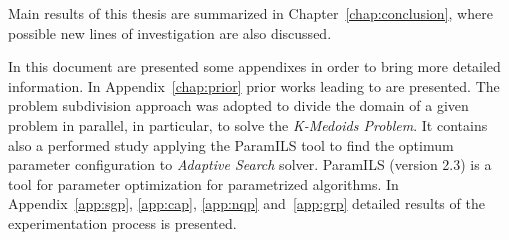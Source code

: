 Main results of this thesis are summarized in Chapter~\ref{chap:conclusion}, where possible new lines of investigation are also discussed.

In this document are presented some appendixes in order to bring more detailed information. In Appendix~\ref{chap:prior} prior works leading to \posl{} are presented. The problem subdivision approach was adopted to divide the domain of a given problem in parallel, in particular, to solve the \textit{K-Medoids Problem}. It contains also a performed study applying the {\sc ParamILS} tool to find the optimum parameter configuration to \textit{Adaptive Search} solver. {\sc ParamILS} (version 2.3) is a tool for parameter optimization for parametrized algorithms. In Appendix~\ref{app:sgp}, \ref{app:cap}, \ref{app:nqp} and~\ref{app:grp} detailed results of the experimentation process is presented.
